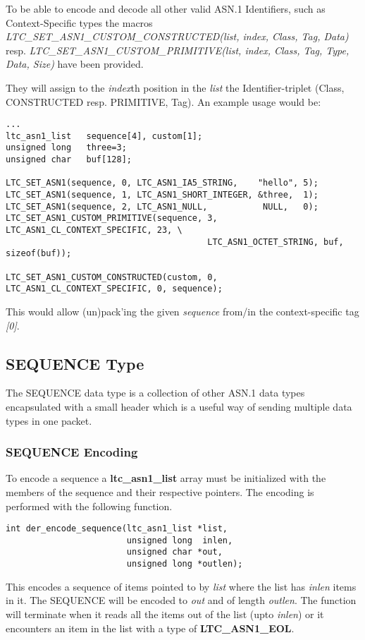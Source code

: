 \documentclass[synpaper]{book}
\begin{document}

To be able to encode and decode all other valid ASN.1 Identifiers, such as Context-Specific types the macros
\textit{LTC\_SET\_ASN1\_CUSTOM\_CONSTRUCTED(list, index, Class, Tag, Data)} resp.
\textit{LTC\_SET\_ASN1\_CUSTOM\_PRIMITIVE(list, index, Class, Tag, Type, Data, Size)} have been provided.

They will assign to the \textit{index}th position in the \textit{list} the Identifier-triplet (Class, CONSTRUCTED resp. PRIMITIVE, Tag).
An example usage would be:

\begin{small}
\begin{verbatim}
...
ltc_asn1_list   sequence[4], custom[1];
unsigned long   three=3;
unsigned char   buf[128];

LTC_SET_ASN1(sequence, 0, LTC_ASN1_IA5_STRING,    "hello", 5);
LTC_SET_ASN1(sequence, 1, LTC_ASN1_SHORT_INTEGER, &three,  1);
LTC_SET_ASN1(sequence, 2, LTC_ASN1_NULL,           NULL,   0);
LTC_SET_ASN1_CUSTOM_PRIMITIVE(sequence, 3, LTC_ASN1_CL_CONTEXT_SPECIFIC, 23, \
                                        LTC_ASN1_OCTET_STRING, buf, sizeof(buf));

LTC_SET_ASN1_CUSTOM_CONSTRUCTED(custom, 0, LTC_ASN1_CL_CONTEXT_SPECIFIC, 0, sequence);
\end{verbatim}
\end{small}

This would allow (un)pack'ing the given \textit{sequence} from/in the context-specific tag \textit{[0]}.

\subsection{SEQUENCE Type}
The SEQUENCE data type is a collection of other ASN.1 data types encapsulated with a small header which is a useful way of sending multiple data types in one packet.

\subsubsection{SEQUENCE Encoding}
To encode a sequence a \textbf{ltc\_asn1\_list} array must be initialized with the members of the sequence and their respective pointers.  The encoding is performed
with the following function.

\begin{verbatim}
int der_encode_sequence(ltc_asn1_list *list,
                        unsigned long  inlen,
                        unsigned char *out,
                        unsigned long *outlen);
\end{verbatim}
This encodes a sequence of items pointed to by \textit{list} where the list has \textit{inlen} items in it.  The SEQUENCE will be encoded to \textit{out} and of length \textit{outlen}.  The
function will terminate when it reads all the items out of the list (upto \textit{inlen}) or it encounters an item in the list with a type of \textbf{LTC\_ASN1\_EOL}.
\end{document}
